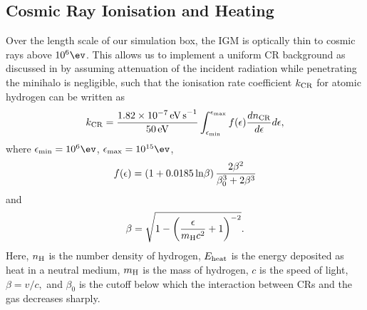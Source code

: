\subsection{Cosmic Ray Ionisation and Heating}
\label{CRchem}
Over the length scale of our simulation box, the IGM is optically thin to cosmic rays above $10^6\ev$. This allows us to implement a uniform CR background as discussed in  by assuming attenuation of the incident radiation while penetrating the minihalo is negligible, such that the ionisation rate coefficient $k_{\rm \small CR}$ for atomic hydrogen \citep{Schlickeiser2002} can be written as
\begin{equation}
k_{\rm \small CR} = \frac{1.82\times10^{-7}\,{\rm \small eV\,s}^{-1}}{50\,{\rm \small eV}} 
    \int_{\epsilon_{\rm min}}^{\epsilon_{\rm max}} f(\epsilon) \frac{dn_{\rm \tiny CR}}{d\epsilon} d\epsilon,
\end{equation}
where $\epsilon_{\rm min} = 10^6\ev$, $\epsilon_{\rm max}= 10^{15}\ev$,
\begin{equation}    
    f(\epsilon) = (1 + 0.0185 \,{\rm ln}\beta )\, \frac{2 \beta^2}{\beta_0^3 + 2 \beta^3}
\end{equation}
and
\begin{equation}
    \beta =  \sqrt{1 - \left( \frac{\epsilon}{m_{\rm \tiny H}c^2}+1 \right)^{-2}}.
\end{equation}
Here, $n_{\rm \small H}$ is the number density of hydrogen, $E_{\rm \small heat}$ is the energy deposited as heat in a neutral medium, $m_{\rm \small H}$ is the mass of hydrogen, $c$ is the speed of light, $\beta = v/c,$ and $\beta_0$ is the cutoff below which the interaction between CRs and the gas decreases sharply.
